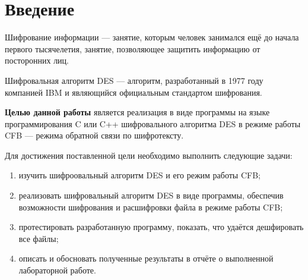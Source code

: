 \chapter*{Введение}

Шифрование информации --- занятие, которым человек занимался ещё до начала первого тысячелетия, занятие, позволяющее защитить информацию от посторонних лиц. 

Шифровальная алгоритм DES --- алгоритм, разработанный в 1977 году компанией IBM и являющийся официальным стандартом шифрования.

\textbf{Целью данной работы} является реализация в виде программы на языке программирования C или C++ шифровального алгоритма DES в режиме работы CFB --- режима обратной связи по шифротексту. 

Для достижения поставленной цели необходимо выполнить следующие задачи:
\begin{enumerate}[label=\arabic*)]
	\item изучить шифроовальный алгоритм  DES и его режим работы CFB;
    \item реализовать шифровальный алгоритм DES в виде программы, обеспечив возможности шифрования и расшифровки файла в режиме работы CFB;
	\item протестировать разработанную программу, показать, что удаётся дешфировать все файлы;
	\item описать и обосновать полученные результаты в отчёте о выполненной лабораторной работе.
\end{enumerate}
